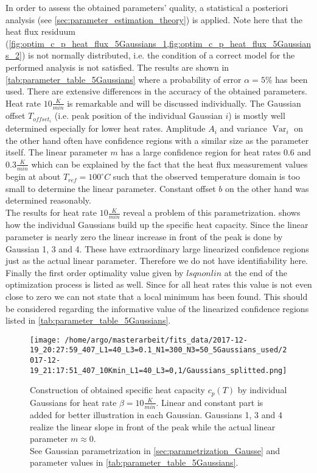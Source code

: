 \documentclass{scrartcl}[12pt, halfparskip]
\numberwithin{equation}{section}
\numberwithin{figure}{section}
\numberwithin{table}{section}
\newcommand{\var}{\operatorname{Var}}
\begin{document}
In order to assess the obtained parameters' quality, a statistical a posteriori analysis (see \cref{sec:parameter_estimation_theory}) is applied. 
Note here that the heat flux residuum (\cref{fig:optim_c_p_heat_flux_5Gaussians_1,fig:optim_c_p_heat_flux_5Gaussians_2}) is not normally distributed, i.e. the condition of a correct model for the performed analysis is not satisfied.
The results are shown in \cref{tab:parameter_table_5Gaussians} where a probability of error $\alpha=5\%$ has been used. 
There are extensive differences in the accuracy of the obtained parameters. Heat rate $10 \frac{K}{min}$ is remarkable and will be discussed individually. 
The Gaussian offset $T_{offset_i}$ (i.e. peak position of the individual Gaussian $i$) is mostly well determined especially for lower heat rates. 
Amplitude $A_i$ and variance $\var_i$ on the other hand often have confidence regions with a similar size as the parameter itself. 
The linear parameter $m$ has a large confidence region for heat rates $0.6$ and $0.3 \frac{K}{min}$ which can be explained by the fact that the heat flux measurement values begin at about $T_{ref}=100^{\circ}C$ such that the observed temperature domain is too small to determine the linear parameter. 
Constant offset $b$ on the other hand was determined reasonably. \\
The results for heat rate $10 \frac{K}{min}$ reveal a problem of this parametrization. 
 shows how the individual Gaussians build up the specific heat capacity. 
Since the linear parameter is nearly zero the linear increase in front of the peak is done by Gaussian 1, 3 and 4. 
These have extraordinary large linearized confidence regions just as the actual linear parameter. Therefore we do not have identifiability here. \\
Finally the first order optimality value given by $lsqnonlin$ at the end of the optimization process is listed as well. Since for all heat rates this value is not even close to zero we can not state that a local minimum has been found. This should be considered regarding the informative value of the linearized confidence regions listed in \cref{tab:parameter_table_5Gaussians}.


\begin{figure}[H]
	\centering
	\texttt{[image: /home/argo/masterarbeit/fits\_data/2017-12-19\_20:27:59\_407\_L1=40\_L3=0.1\_N1=300\_N3=50\_5Gaussians\_used/2017-12-19\_21:17:51\_407\_10Kmin\_L1=40\_L3=0,1/Gaussians\_splitted.png]}
	\caption{Construction of obtained specific heat capacity $c_p(T)$ by individual Gaussians for heat rate $\beta = 10 \frac{K}{min}$. Linear and constant part is added for better illustration in each Gaussian. Gaussians 1, 3 and 4 realize the linear slope in front of the peak while the actual linear parameter $m \approx 0$. \\
	See Gaussian parametrization in \cref{sec:parametrization_Gausse} and parameter values in \cref{tab:parameter_table_5Gaussians}.}
	\label{fig:Gaussians_splitted_pathologic}
\end{figure}
\end{document}
